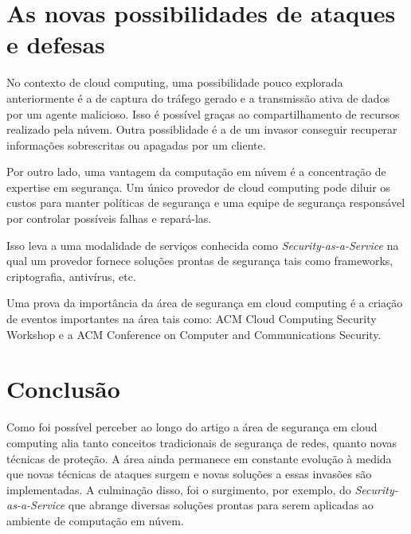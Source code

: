 \documentclass[brazil,12pt]{article}
\begin{document}
\section{As novas possibilidades de ataques e defesas}
No contexto de cloud computing, uma possibilidade pouco explorada anteriormente
é a de captura do tráfego gerado e a transmissão ativa de dados por um agente
malicioso. Isso é possível graças ao compartilhamento de recursos realizado pela
núvem. Outra possiblidade é a de um invasor conseguir recuperar informações
sobrescritas ou apagadas por um cliente. 

Por outro lado, uma vantagem da computação em núvem é a concentração de
expertise em segurança. Um único provedor de cloud computing pode diluir os
custos para manter políticas de segurança e uma equipe de segurança responsável
por controlar possíveis falhas e repará-las.

Isso leva a uma modalidade de serviços conhecida como
\emph{Security-as-a-Service} na qual um provedor fornece soluções prontas de
segurança tais como frameworks, criptografia, antivírus, etc.

Uma prova da importância da área de segurança em cloud computing é a criação de
eventos importantes na área tais como: ACM Cloud Computing Security Workshop e a
ACM Conference on Computer and Communications Security.

\section{Conclusão}
Como foi possível perceber ao longo do artigo a área de segurança em cloud
computing alia tanto conceitos tradicionais de segurança de redes, quanto novas
técnicas de proteção. A área ainda permanece em constante evolução à medida que
novas técnicas de ataques surgem e novas soluções a essas invasões são
implementadas. A culminação disso, foi o surgimento, por exemplo, do
\emph{Security-as-a-Service} que abrange diversas soluções prontas para serem
aplicadas ao ambiente de computação em núvem.

\nocite{*}


\end{document}
